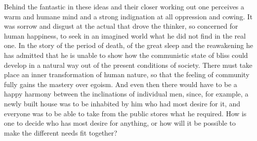 \documentclass[12pt,a4paper,openany]{book}
\begin{document}
Behind the fantastic in these ideas and their closer
working out one perceives a warm and humane mind and a
strong indignation at all oppression and cowing. It was
sorrow and disgust at the actual that drove the thinker, so concerned for human
happiness, to seek in an imagined world
what he did not find in the real one. In the story of
the period of death, of the great sleep and the reawakening he
has admitted that he is unable to show how
the communistic state of bliss could develop
in a natural way out of the present conditions of society.
There must take place an inner transformation of human nature,
so that the feeling of community fully gains
the mastery over egoism. And even then there would have to be
a happy harmony between the inclinations of individual men,
since, for example, a newly built house was to be inhabited by him
who had most desire for it, and everyone was to be able to take
from the public stores what he required. How
is one to decide who has most desire for anything,
or how will it be possible to make the different
needs fit together?
\end{document}
